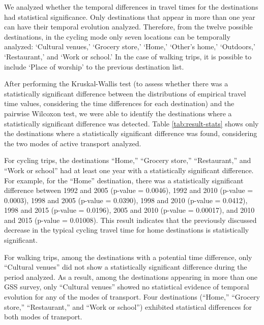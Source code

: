 \documentclass[preprint, 3p,
authoryear]{elsarticle} %
\begin{document}
We analyzed whether the temporal differences in travel times for the
destinations had statistical significance. Only destinations that appear
in more than one year can have their temporal evolution analyzed.
Therefore, from the twelve possible destinations, in the cycling mode
only seven locations can be temporally analyzed: `Cultural venues,'
`Grocery store,' `Home,' `Other's home,' `Outdoors,' `Restaurant,' and
`Work or school.' In the case of walking trips, it is possible to
include `Place of worship' to the previous destination list.

After performing the Kruskal-Wallis test (to assess whether there was a
statistically significant difference between the distributions of
empirical travel time values, considering the time differences for each
destination) and the pairwise Wilcoxon test, we were able to identify
the destinations where a statistically significant difference was
detected. Table \ref{tab:result-stats} shows only the destinations where
a statistically significant difference was found, considering the two
modes of active transport analyzed.

For cycling trips, the destinations ``Home,'' ``Grocery store,''
``Restaurant,'' and ``Work or school'' had at least one year with a
statistically significant difference. For example, for the ``Home''
destination, there was a statistically significant difference between
1992 and 2005 (p-value = 0.0046), 1992 and 2010 (p-value = 0.0003), 1998
and 2005 (p-value = 0.0390), 1998 and 2010 (p-value = 0.0412), 1998 and
2015 (p-value = 0.0196), 2005 and 2010 (p-value = 0.00017), and 2010 and
2015 (p-value = 0.01008). This result indicates that the previously
discussed decrease in the typical cycling travel time for home
destinations is statistically significant.

For walking trips, among the destinations with a potential time
difference, only ``Cultural venues'' did not show a statistically
significant difference during the period analyzed. As a result, among
the destinations appearing in more than one GSS survey, only ``Cultural
venues'' showed no statistical evidence of temporal evolution for any of
the modes of transport. Four destinations (``Home,'' ``Grocery store,''
``Restaurant,'' and ``Work or school'') exhibited statistical
differences for both modes of transport.
\end{document}
